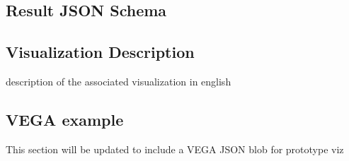 \documentclass{article}
\begin{document}
  \subsection{Result JSON Schema}
  \subsection{Visualization Description}
  description of the associated visualization in english
  \subsection{VEGA example}
  This section will be updated to include a VEGA JSON blob for prototype viz
\end{document}
